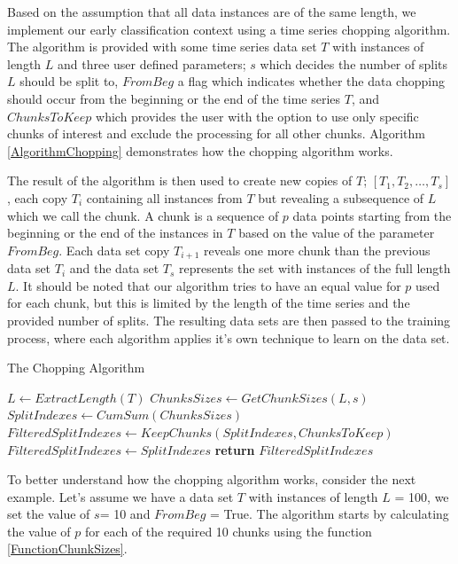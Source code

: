 Based on the assumption that all data instances are of the same length, we implement our early classification context using a time series chopping algorithm.
The algorithm is provided with some time series data set $T$ with instances of length $L$ and three user defined parameters; $s$ which decides the number of splits $L$ should be split to,
$FromBeg$ a flag which indicates whether the data chopping should occur from the beginning or the end of the time series $T$, and $ChunksToKeep$ which provides the user
with the option to use only specific chunks of interest and exclude the processing for all other chunks.
Algorithm \ref{AlgorithmChopping} demonstrates how the chopping algorithm works.

The result of the algorithm is then used to create new copies of $T$; $[T_{1}, T_{2}, \ldots, T_{s}]$, each copy $T_{i}$ containing all instances from $T$ but revealing a subsequence of $L$
which we call the chunk. A chunk is a sequence of $p$ data points starting from the beginning or the end of the instances in $T$ based on the value of the parameter $FromBeg$.
Each data set copy $T_{i+1}$ reveals one more chunk than the previous data set $T_{i}$ and the data set $T_{s}$ represents the set with instances of the full length $L$.
It should be noted that our algorithm tries to have an equal value for $p$ used for each chunk, but this is limited by the length of the time series and the provided number of splits.
The resulting data sets are then passed to the training process, where each algorithm applies it's own technique to learn on the data set.

\begin{algorithm}
    \caption{The Chopping Algorithm}\label{AlgorithmChopping}
    \begin{algorithmic}[1]
        \State $L \gets ExtractLength(T)$
        \State $ChunksSizes \gets GetChunkSizes(L,s)$
        \State $SplitIndexes \gets CumSum(ChunksSizes)$
                \State $FilteredSplitIndexes \gets KeepChunks(SplitIndexes,ChunksToKeep)$
            \Else
                \State $FilteredSplitIndexes \gets SplitIndexes$
            \EndIf
        \State \textbf{return} $FilteredSplitIndexes$
      \EndFunction
    \end{algorithmic}
\end{algorithm}

To better understand how the chopping algorithm works, consider the next example.
Let's assume we have a data set $T$ with instances of length $L$ = 100, we set the value of $s$= 10 and $FromBeg$ = True.
The algorithm starts by calculating the value of $p$ for each of the required 10 chunks using the function \ref{FunctionChunkSizes}.

